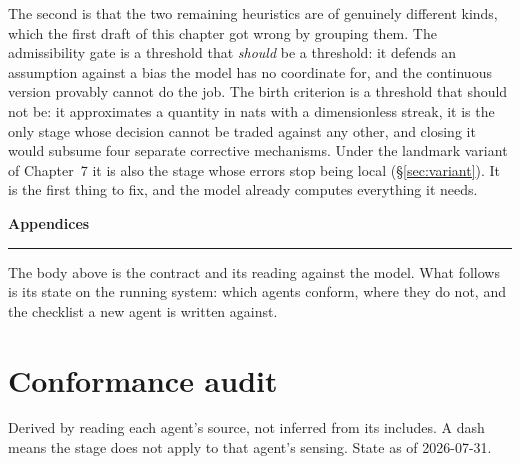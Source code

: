 \documentclass[11pt,a4paper]{report}
\begin{document}
The second is that the two remaining heuristics are of genuinely different kinds, which the first
draft of this chapter got wrong by grouping them. The admissibility gate is a threshold that
\emph{should} be a threshold: it defends an assumption against a bias the model has no coordinate
for, and the continuous version provably cannot do the job. The birth criterion is a threshold that
should not be: it approximates a quantity in nats with a dimensionless streak, it is the only stage
whose decision cannot be traded against any other, and closing it would subsume four separate
corrective mechanisms. Under the landmark variant of Chapter~7 it is also the stage whose errors stop
being local (\S\ref{sec:variant}). It is the first thing to fix, and the model already computes
everything it needs.

\clearpage
\appendix
\renewcommand{\thesection}{\Alph{section}}
\setcounter{section}{0}

\begin{center}
{\Large\bfseries Appendices}\\[4pt]
\rule{0.32\textwidth}{0.4pt}
\end{center}

\medskip\noindent
The body above is the contract and its reading against the model. What follows is its state on the
running system: which agents conform, where they do not, and the checklist a new agent is written
against.

\section{Conformance audit}
\label{sec:audit}

Derived by reading each agent's source, not inferred from its includes. A dash means the stage does
not apply to that agent's sensing. State as of 2026-07-31.
\end{document}
